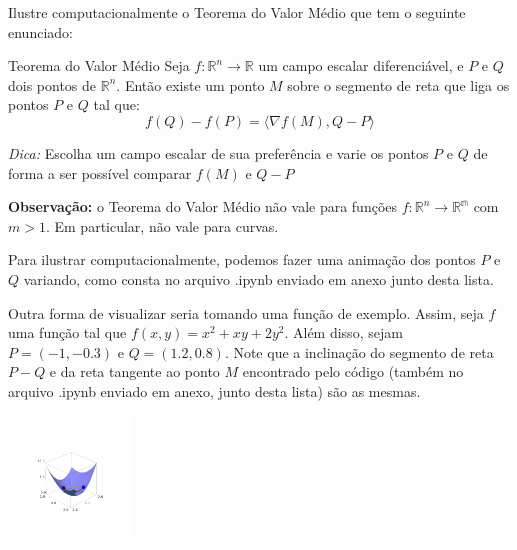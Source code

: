 \documentclass[../main.tex]{subfiles}
\begin{document}
		\begin{exercicio}{3}
			Ilustre computacionalmente o Teorema do Valor Médio que
			tem o seguinte enunciado:
			\begin{teorema}{Teorema do Valor Médio}
				Seja $f\colon \mathbb{R}^n\to \mathbb{R}$ um campo escalar diferenciável, e $P$ e $Q$ dois pontos de $\mathbb{R}^n$. Então existe um ponto $M$ sobre o segmento de reta que liga os pontos $P$ e $Q$ tal que:
				\[
				f(Q)-f(P)=\langle \nabla f(M), Q-P\rangle
				\]
			\end{teorema}
			\textit{Dica:} Escolha um campo escalar de sua preferência e varie os pontos $P$ e $Q$ de forma a ser possível comparar $f(M)$ e $Q-P$
			
			\textbf{Observação:} o Teorema do Valor Médio não vale para funções $f\colon \mathbb{R}^n\to \mathbb{R^m}$ com $m>1$. Em particular, não vale para curvas.
		\end{exercicio} 
		\begin{solucao}
			Para ilustrar computacionalmente, podemos fazer uma animação dos pontos $P$ e $Q$ variando, como consta no arquivo .ipynb enviado em anexo junto desta lista.
			
			Outra forma de visualizar seria tomando uma função de exemplo. Assim, seja $f$ uma função tal que $f(x,y)=x^2 + xy + 2y^2$. Além disso, sejam $P=(-1,-0.3)$ e $Q=(1.2, 0.8)$. Note que a inclinação do segmento de reta $P-Q$ e da reta tangente ao ponto $M$ encontrado pelo código (também no arquivo .ipynb enviado em anexo, junto desta lista) são as mesmas.
			\begin{center}
				\includegraphics[width=0.25\textwidth]{imagens/lista04/picture_lista04.02_q03.png}
			\end{center}
		\end{solucao}
\end{document}
